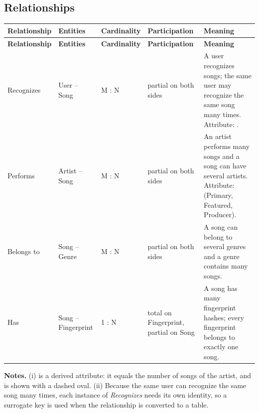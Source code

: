 \documentclass[11pt,a4paper]{article}
\newcommand{\cl}[1]{\texttt{\detokenize{#1}}}
\begin{document}
\subsection{Relationships}

\begin{longtable}{|p{2.4cm}|p{3.0cm}|p{2.0cm}|p{3.0cm}|p{4.8cm}|}
\hline
\textbf{Relationship} & \textbf{Entities} & \textbf{Cardinality} & \textbf{Participation} & \textbf{Meaning} \\
\hline
\endfirsthead

\hline
\textbf{Relationship} & \textbf{Entities} & \textbf{Cardinality} & \textbf{Participation} & \textbf{Meaning} \\
\hline
\endhead

Recognizes & User -- Song & M : N & partial on both sides & A user recognizes songs; the same user may recognize the same song many times. Attribute: \cl{recognized_at}. \\
\hline
Performs & Artist -- Song & M : N & partial on both sides & An artist performs many songs and a song can have several artists. Attribute: \cl{role} (Primary, Featured, Producer). \\
\hline
Belongs to & Song -- Genre & M : N & partial on both sides & A song can belong to several genres and a genre contains many songs. \\
\hline
Has & Song -- Fingerprint & 1 : N & total on Fingerprint, partial on Song & A song has many fingerprint hashes; every fingerprint belongs to exactly one song. \\
\hline
\end{longtable}
\textbf{Notes.} (i) \cl{tot_songs} is a derived attribute: it equals the number of songs of the artist, and is shown with a dashed oval. (ii) Because the same user can recognize the same song many times, each instance of \emph{Recognizes} needs its own identity, so a surrogate key \cl{history_id} is used when the relationship is converted to a table.


\end{document}
